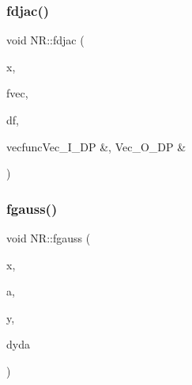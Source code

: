 \mbox{\label{namespaceNR_af8ad4af19ff3fab8ac42dea99a9ccfae}} 
\subsubsection{\texorpdfstring{fdjac()}{fdjac()}}
{\footnotesize\ttfamily void N\+R\+::fdjac (\begin{DoxyParamCaption}\item[{\mbox{\hyperlink{namespaceNR_ab293e06a6bf799d8a7ed932b6852bcb8}{Vec\+\_\+\+I\+O\+\_\+\+DP}} \&}]{x,  }\item[{\mbox{\hyperlink{namespaceNR_a9f943da53862537c552e2a770cb170ae}{Vec\+\_\+\+I\+\_\+\+DP}} \&}]{fvec,  }\item[{\mbox{\hyperlink{namespaceNR_adc1f8da33094b6bbeb1f5f899515ce54}{Mat\+\_\+\+O\+\_\+\+DP}} \&}]{df,  }\item[{void }]{vecfuncVec\+\_\+\+I\+\_\+\+D\+P \&, Vec\+\_\+\+O\+\_\+\+D\+P \& }\end{DoxyParamCaption})}

\mbox{\label{namespaceNR_a68c568aec5a9a2199de3c66ecc87c062}} 
\subsubsection{\texorpdfstring{fgauss()}{fgauss()}}
{\footnotesize\ttfamily void N\+R\+::fgauss (\begin{DoxyParamCaption}\item[{const \mbox{\hyperlink{namespaceNR_af6ff762dd605ff477b8e52387253a02a}{DP}}}]{x,  }\item[{\mbox{\hyperlink{namespaceNR_a9f943da53862537c552e2a770cb170ae}{Vec\+\_\+\+I\+\_\+\+DP}} \&}]{a,  }\item[{\mbox{\hyperlink{namespaceNR_af6ff762dd605ff477b8e52387253a02a}{DP}} \&}]{y,  }\item[{\mbox{\hyperlink{namespaceNR_a970094d23441f8ef6a45282a7eb2103d}{Vec\+\_\+\+O\+\_\+\+DP}} \&}]{dyda }\end{DoxyParamCaption})}

\mbox{\label{namespaceNR_aa9df2e2aa873647992817340091009dd}} 

